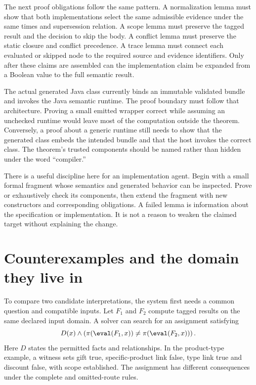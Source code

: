 The next proof obligations follow the same pattern. A normalization lemma must
show that both implementations select the same admissible evidence under the
same times and supersession relation. A scope lemma must preserve the tagged
result and the decision to skip the body. A conflict lemma must preserve the
static closure and conflict precedence. A trace lemma must connect each
evaluated or skipped node to the required source and evidence identifiers.
Only after these claims are assembled can the implementation claim be expanded
from a Boolean value to the full semantic result.

The actual generated Java class currently binds an immutable validated bundle
and invokes the Java semantic runtime. The proof boundary must follow that
architecture. Proving a small emitted wrapper correct while assuming an
unchecked runtime would leave most of the computation outside the theorem.
Conversely, a proof about a generic runtime still needs to show that the
generated class embeds the intended bundle and that the host invokes the
correct class. The theorem's trusted components should be named rather than
hidden under the word ``compiler.''

There is a useful discipline here for an implementation agent. Begin with a
small formal fragment whose semantics and generated behavior can be inspected.
Prove or exhaustively check its components, then extend the fragment with new
constructors and corresponding obligations. A failed lemma is information
about the specification or implementation. It is not a reason to weaken the
claimed target without explaining the change.

\section{Counterexamples and the domain they live in}
\label{merge:M03:09}

\label{sec:proof-counterexamples}
To compare two candidate interpretations, the system first needs a common
question and compatible inputs. Let $F_1$ and $F_2$ compute tagged results on
the same declared input domain. A solver can search for an assignment satisfying
\begin{equation}
 D(x)\land\left(\pi(\eval(F_1,x))\ne
                         \pi(\eval(F_2,x))\right).
 \label{eq:difference-query}
\end{equation}
Here $D$ states the permitted facts and relationships. In the product-type
example, a witness sets gift true, specific-product link false, type link true
and discount false, with scope established. The assignment has different
consequences under the complete and omitted-route rules.

